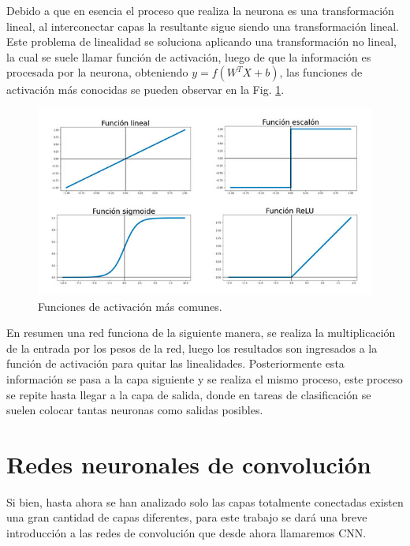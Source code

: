 Debido a que en esencia el proceso que realiza la neurona es una transformación lineal, al interconectar capas la resultante sigue siendo una transformación lineal.
Este problema de linealidad se soluciona aplicando una transformación no lineal, la cual se suele llamar función de activación,
luego de que la información es procesada por la neurona, obteniendo $y= f(W^T X + b)$, las funciones de activación más conocidas se pueden observar en la Fig. \ref{fig:funciones-activacion}.

\begin{figure}
    \centering
    \includegraphics[width=1\textwidth]{imgs/Funciones-de-activacion.jpg}
    \caption{Funciones de activación más comunes.}
    \label{fig:funciones-activacion}
\end{figure}

En resumen una red funciona de la siguiente manera, se realiza la multiplicación de la entrada por los pesos de la red, luego los resultados son ingresados a la función de activación para quitar las linealidades. Posteriormente esta información se pasa a la capa siguiente y se realiza el mismo proceso, este proceso se repite hasta llegar a la capa de salida, donde en tareas de clasificación se suelen colocar tantas neuronas como salidas posibles.

\section{Redes neuronales de convolución}

Si bien, hasta ahora se han analizado solo las capas totalmente conectadas existen una gran cantidad de capas diferentes, para este trabajo se dará una breve introducción a las redes de convolución que desde ahora llamaremos CNN.

